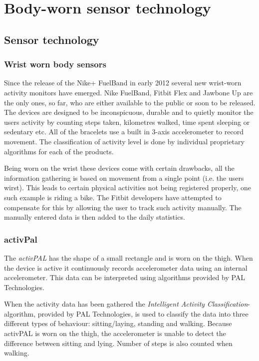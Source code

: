 \chapter{Body-worn sensor technology}

\section{Sensor technology}

\subsection{Wrist worn body sensors}
Since the release of the Nike+ FuelBand \cite{fuelBand} in early 2012 several new wrist-worn activity monitors have emerged. Nike FuelBand, Fitbit Flex and Jawbone Up are the only ones, so far, who are either available to the public or soon to be released. The devices are designed to be inconspicuous, durable and to quietly monitor the users activity by counting steps taken, kilometres walked, time spent sleeping or sedentary etc. All of the bracelets use a built in 3-axis accelerometer to record movement. The classification of activity level is done by individual proprietary algorithms for each of the products. 

Being worn on the wrist these devices come with certain drawbacks, all the information gathering is based on movement from a single point (i.e. the users wirst). This leads to certain physical activities not being registered properly, one such example is riding a bike. The Fitbit developers have attempted to compensate for this by allowing the user to track such activity manually. The manually entered data is then added to the daily statistics. 

\subsection{activPal}
The \emph{activPAL} has the shape of a small rectangle and is worn on the thigh. When the device is active it continuously records accelerometer data using an internal accelerometer. This data can be interpreted using algorithms provided by PAL Technologies.

When the activity data has been gathered the \emph{Intelligent Activity Classification}-algorithm, provided by PAL Technologies, is used to classify the data into three different types of behaviour: sitting/laying, standing and walking. Because activPAL is worn on the thigh, the accelerometer is unable to detect the difference between sitting and lying. Number of steps is also counted when walking.

